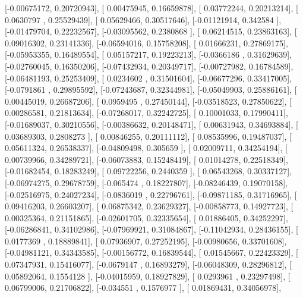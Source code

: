 \documentclass{article}
\begin{document}
       [-0.00675172,  0.20720943],
       [ 0.00475945,  0.16659878],
       [ 0.03772244,  0.20213214],
       [ 0.0630797 ,  0.25529439],
       [ 0.05629466,  0.30517646],
       [-0.01121914,  0.342584  ],
       [-0.01479704,  0.22232567],
       [-0.03095562,  0.2380868 ],
       [ 0.06214515,  0.23863163],
       [ 0.09016302,  0.23141336],
       [-0.06594016,  0.15758208],
       [ 0.01666231,  0.27869175],
       [-0.05953355,  0.16489554],
       [ 0.05157217,  0.19223213],
       [-0.0366186 ,  0.31629639],
       [-0.02760045,  0.16350206],
       [-0.07432934,  0.20349717],
       [-0.00727982,  0.16784589],
       [-0.06481193,  0.25253409],
       [ 0.0234602 ,  0.31501604],
       [-0.06677296,  0.33417005],
       [-0.0791861 ,  0.29895592],
       [-0.07243687,  0.32344981],
       [-0.05049903,  0.25886161],
       [ 0.00445019,  0.26687206],
       [ 0.0959495 ,  0.27450144],
       [-0.03518523,  0.27850622],
       [ 0.00286581,  0.21813634],
       [-0.07268017,  0.32242725],
       [ 0.10001033,  0.17990411],
       [-0.01689037,  0.30210556],
       [-0.00386632,  0.20148471],
       [ 0.00631943,  0.34693884],
       [ 0.03689303,  0.2808273 ],
       [ 0.00846255,  0.20111112],
       [ 0.08535996,  0.19487037],
       [ 0.05611324,  0.26538337],
       [-0.04809498,  0.305659  ],
       [ 0.02009711,  0.34254194],
       [ 0.00739966,  0.34289721],
       [-0.06073883,  0.15248419],
       [ 0.01014278,  0.22518349],
       [-0.01682454,  0.18283249],
       [ 0.09722256,  0.2440359 ],
       [ 0.06543268,  0.30337127],
       [-0.06974275,  0.29678759],
       [-0.065474  ,  0.18227807],
       [-0.08246439,  0.19070158],
       [-0.02516975,  0.24027234],
       [-0.0836019 ,  0.22796761],
       [-0.09871185,  0.31716965],
       [ 0.09416203,  0.26603207],
       [ 0.06875342,  0.23629327],
       [-0.00858773,  0.14927723],
       [ 0.00325364,  0.21151865],
       [-0.02601705,  0.32335654],
       [ 0.01886405,  0.34252297],
       [-0.06286841,  0.34102986],
       [-0.07969921,  0.31084867],
       [-0.11042934,  0.28436155],
       [ 0.0177369 ,  0.18889841],
       [ 0.07936907,  0.27252195],
       [-0.00980656,  0.33701608],
       [-0.04981121,  0.34343585],
       [-0.00156772,  0.16839544],
       [ 0.01545667,  0.22423329],
       [ 0.07347931,  0.15416077],
       [-0.0679147 ,  0.16893279],
       [-0.06048309,  0.28296812],
       [ 0.05892064,  0.1554128 ],
       [-0.04015959,  0.18927829],
       [ 0.0293961 ,  0.23297498],
       [ 0.06799006,  0.21706822],
       [-0.034551  ,  0.1576977 ],
       [ 0.01869431,  0.34056978],
\end{document}
